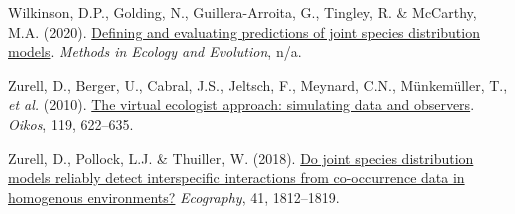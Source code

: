 \documentclass[9pt,biorxiv,doublespacing,lineno]{lapreprint}
\newlength{\cslhangindent}
\newlength{\cslentryspacingunit} %
\newenvironment{CSLReferences}[2] %
 {%
  \setlength{\parindent}{0pt}
  \ifodd #1
  \let\oldpar\par
  \def\par{\hangindent=\cslhangindent\oldpar}
  \fi
  \setlength{\parskip}{#2\cslentryspacingunit}
 }%
 {}
\begin{document}
\begin{CSLReferences}{1}{0}
\leavevmode{}%
Wilkinson, D.P., Golding, N., Guillera-Arroita, G., Tingley, R. \&
McCarthy, M.A. (2020).
\href{https://doi.org/10.1111/2041-210X.13518}{Defining and evaluating
predictions of joint species distribution models}. \emph{Methods in
Ecology and Evolution}, n/a.

\leavevmode{}%
Zurell, D., Berger, U., Cabral, J.S., Jeltsch, F., Meynard, C.N.,
Münkemüller, T., \emph{et al.} (2010).
\href{https://doi.org/10.1111/j.1600-0706.2009.18284.x}{The virtual
ecologist approach: simulating data and observers}. \emph{Oikos}, 119,
622--635.

\leavevmode{}%
Zurell, D., Pollock, L.J. \& Thuiller, W. (2018).
\href{https://doi.org/10.1111/ecog.03315}{Do joint species distribution
models reliably detect interspecific interactions from co-occurrence
data in homogenous environments?} \emph{Ecography}, 41, 1812--1819.

\end{CSLReferences}

\if@endfloat\clearpage\processdelayedfloats\clearpage\fi 






\end{document}
